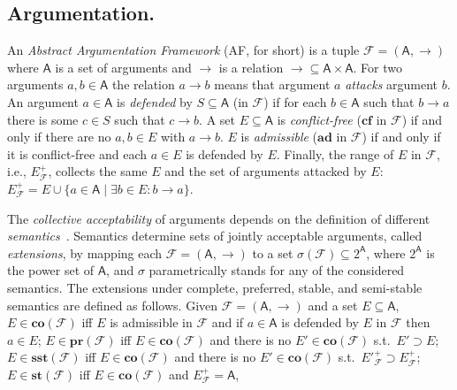 \documentclass[conference]{IEEEtran}
\newcommand{\powerset}[1]{\ensuremath{2^{#1}}} %
\newcommand{\AF}{\ensuremath{\mathcal{F}}\xspace} %
\newcommand{\F}{\ensuremath{\mathcal{F}}\xspace} %
\newcommand{\args}{\ensuremath{\mathsf{A}}\xspace} %
\newcommand{\atts}{\ensuremath{\rightarrow}\xspace}
\newcommand{\attackers}[2]{\ensuremath{\mathcal{F}_{#1}(#2)\xspace}} %
\newcommand{\AFC}{\ensuremath{\AF=(\args,\atts)}\xspace} %
\newcommand{\cA}{\ensuremath{\mathcal{A}}} %
\newcommand{\cB}{\ensuremath{\mathcal{B}}} %
\newcommand{\cC}{\ensuremath{\mathcal{C}}} %
\newcommand{\af}{AF}
\newcommand{\cf}{\mathbf{cf}}
\newcommand{\ad}{\mathbf{ad}}
\newcommand{\co}{\mathbf{co}}
\newcommand{\pr}{\mathbf{pr}}
\newcommand{\st}{\mathbf{st}}
\newcommand{\sst}{\mathbf{sst}}
\begin{document}
\subsection{Argumentation.}\label{sect:bgarg} An \emph{Abstract Argumentation Framework} (\af, for short) \cite{Dung:1995}
is a tuple $\F=(\args,\atts)$ where
\args is a set of arguments and
\atts is a relation $\atts\subseteq \args\times\args$.
For two arguments $a,b\in\args$ the relation $a \atts b$ means that argument $a$ \emph{attacks} argument $b$.
An argument $a \in \args$ is \emph{defended} by $S \subseteq \args$ (in $\F$)
if for each $b \in \args$ such that $b \atts a$
there is some $c \in S$ such that $c \atts b$.
A set $E \subseteq \args$ is \emph{conflict-free} ($\cf$ in \F) if and only if there are no $a,b\in E$ with $a \atts b$.
$E$ is \emph{admissible} ($\ad$ in \F) if and only if it is conflict-free and each $a \in E$ is defended by $E$.
Finally, the range of $E$ in $\F$, i.e., $E^{+}_\F$, collects the same $E$ and the set of arguments attacked by $E$: $E^{+}_\F=E \cup \{a\in\args \mid \exists b\in E: b \atts a\}$.


The \emph{collective acceptability} of  arguments depends on the definition of
different \textit{semantics}~\cite{Dung:1995}.  Semantics determine
sets of jointly acceptable arguments, called \emph{extensions}, by
mapping each \AFC to a set $\sigma(\F) \subseteq \powerset{\args}$, where $\powerset{\args}$ is the  power set of $\args$, and $\sigma$ parametrically stands for any of the considered semantics.
The extensions under complete, preferred, stable,  and semi-stable
semantics are defined as follows.
Given \AFC and a set $E \subseteq \args$, $E \in \co(\F)$ iff $E$ is admissible in $\F$ and if $a \in \args$ is defended by $E$ in $\F$ then $a\in E$;  $E \in \pr(\F)$ iff $E \in \co(\F)$ and there is no $E' \in \co(\F)$ s.t.\ $E' \supset E$; $E \in \sst(\F)$ iff $E \in \co(\F)$ and there is no $E' \in \co(\F)$ s.t.\ $E'^+_\F \supset E^+_\F$; $E \in \st(\F)$ iff $E \in \co(\F)$ and $E^+_\F = \args$,
\end{document}
